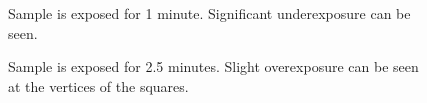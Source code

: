 \begin{figure}[H]
	\centering
	\caption{Sample is exposed for 1 minute. Significant underexposure can be seen.}
	\label{fig:b3d1}
\end{figure}
\begin{figure}[H]
	\centering
	\caption{Sample is exposed for 2.5 minutes. Slight overexposure can be seen at the vertices of the squares.}
	\label{fig:b3e1}
\end{figure}
